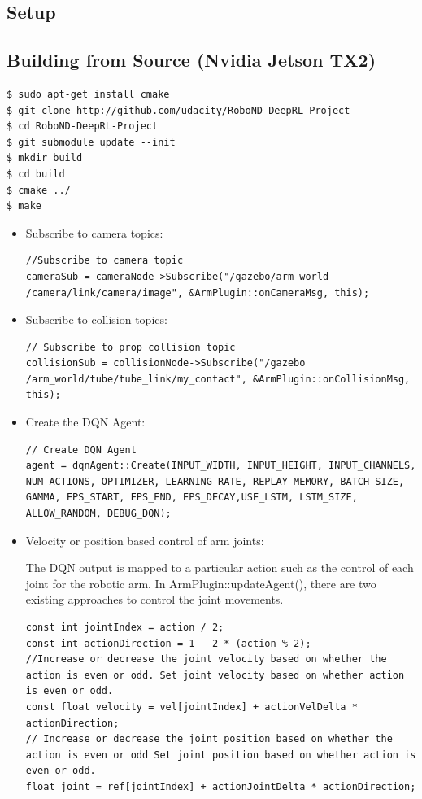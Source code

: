 \documentclass[10pt,journal,compsoc]{IEEEtran}
\begin{document}
\subsection{Setup}
\subsection{Building from Source (Nvidia Jetson TX2)}

\begin{lstlisting}
$ sudo apt-get install cmake
$ git clone http://github.com/udacity/RoboND-DeepRL-Project
$ cd RoboND-DeepRL-Project
$ git submodule update --init
$ mkdir build
$ cd build
$ cmake ../
$ make
\end{lstlisting}
\begin{itemize}
\item  Subscribe to camera topics:
\begin{lstlisting}
//Subscribe to camera topic
cameraSub = cameraNode->Subscribe("/gazebo/arm_world
/camera/link/camera/image", &ArmPlugin::onCameraMsg, this);
\end{lstlisting}
\item Subscribe to collision topics:
\begin{lstlisting}
// Subscribe to prop collision topic
collisionSub = collisionNode->Subscribe("/gazebo
/arm_world/tube/tube_link/my_contact", &ArmPlugin::onCollisionMsg, this);
\end{lstlisting}
\item Create the DQN Agent:
\begin{lstlisting}
// Create DQN Agent
agent = dqnAgent::Create(INPUT_WIDTH, INPUT_HEIGHT, INPUT_CHANNELS, NUM_ACTIONS, OPTIMIZER, LEARNING_RATE, REPLAY_MEMORY, BATCH_SIZE, GAMMA, EPS_START, EPS_END, EPS_DECAY,USE_LSTM, LSTM_SIZE, ALLOW_RANDOM, DEBUG_DQN);
\end{lstlisting}
\item Velocity or position based control of arm joints:

The DQN output is mapped to a particular action such as the control of each joint for the robotic arm. In ArmPlugin::updateAgent(), there are two existing approaches to control the joint movements.
\begin{lstlisting}
const int jointIndex = action / 2;
const int actionDirection = 1 - 2 * (action % 2);
//Increase or decrease the joint velocity based on whether the action is even or odd. Set joint velocity based on whether action is even or odd.
const float velocity = vel[jointIndex] + actionVelDelta * actionDirection; 
// Increase or decrease the joint position based on whether the action is even or odd Set joint position based on whether action is even or odd.
float joint = ref[jointIndex] + actionJointDelta * actionDirection;
\end{lstlisting}


\end{itemize}
\end{document}
